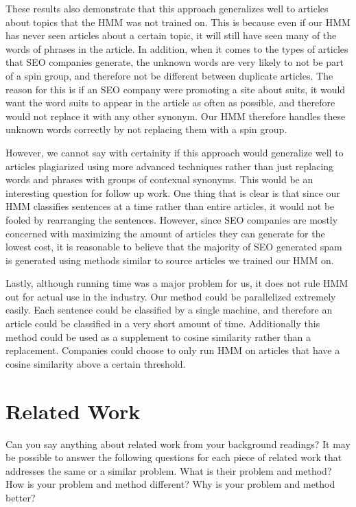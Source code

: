\documentclass[11pt,letterpaper,oneside, titlepage]{scrartcl}
\begin{document}
These results also demonstrate that this approach generalizes well to articles about topics that the HMM was not trained on. This is because even if our HMM has never seen articles about a certain topic, it will still have seen many of the words of phrases in the article. In addition, when it comes to the types of articles that SEO companies generate, the unknown words are very likely to not be part of a spin group, and therefore not be different between duplicate articles. The reason for this is if an SEO company were promoting a site about suits, it would want the word suits to appear in the article as often as possible, and therefore would not replace it with any other synonym. Our HMM therefore handles these unknown words correctly by not replacing them with a spin group. 

However, we cannot say with certainity if this approach would generalize well to articles plagiarized using more advanced techniques rather than just replacing words and phrases with groups of contexual synonyms. This would be an interesting question for follow up work. One thing that is clear is that since our HMM classifies sentences at a time rather than entire articles, it would not be fooled by rearranging the sentences. However, since SEO companies are mostly concerned with maximizing the amount of articles they can generate for the lowest cost, it is reasonable to believe that the majority of SEO generated spam is generated using methods similar to source articles we trained our HMM on.

Lastly, although running time was a major problem for us, it does not rule HMM out for actual use in the industry. Our method could be parallelized extremely easily. Each sentence could be classified by a single machine, and therefore an article could be classified in a very short amount of time. Additionally this method could be used as a supplement to cosine similarity rather than a replacement. Companies could choose to only run HMM on articles that have a cosine similarity above a certain threshold.
\section{Related Work}

Can you say anything about related work from your background readings? It may be possible to answer the following questions for each piece of related work that addresses the same or a similar problem. What is their problem and method? How is your problem and method different? Why is your problem and method better? 
\end{document}
